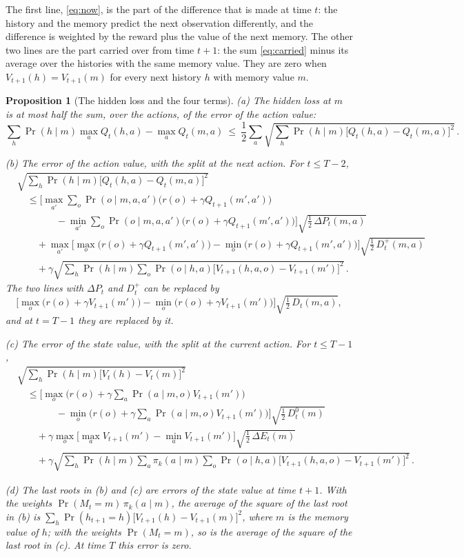 \documentclass[11pt]{article}
\newtheorem{proposition}{Proposition}
\theoremstyle{definition}
\newcommand{\dE}{\Delta E}
\newcommand{\dP}{\Delta P}
\begin{document}
The first line, \eqref{eq:now}, is the part of the difference that is made at time $t$: the history and the memory predict the next observation differently, and the difference is weighted by the reward plus the value of the next memory. The other two lines are the part carried over from time $t+1$: the sum \eqref{eq:carried} minus its average over the histories with the same memory value. They are zero when $V_{t+1}(h)=V_{t+1}(m)$ for every next history $h$ with memory value $m$.

\begin{proposition}[The hidden loss and the four terms]\label{prop:terms}
(a) The hidden loss at $m$ is at most half the sum, over the actions, of the error of the action value:
\[
\sum_h\Pr(h\mid m)\max_aQ_t(h,a)-\max_aQ_t(m,a)\ \le\ \frac12\sum_a\sqrt{\sum_h\Pr(h\mid m)\big[Q_t(h,a)-Q_t(m,a)\big]^2}\,.
\]

(b) The error of the action value, with the split at the next action. For $t\le T-2$,
\begin{align*}
&\sqrt{\sum_h\Pr(h\mid m)\big[Q_t(h,a)-Q_t(m,a)\big]^2}\\
&\quad\le\Big[\max_{a'}\sum_o\Pr(o\mid m,a,a')\big(r(o)+\gamma Q_{t+1}(m',a')\big)\\
&\qquad\qquad-\min_{a'}\sum_o\Pr(o\mid m,a,a')\big(r(o)+\gamma Q_{t+1}(m',a')\big)\Big]\sqrt{\tfrac12\,\dP_t(m,a)}\\
&\qquad+\max_{a'}\Big[\max_o\big(r(o)+\gamma Q_{t+1}(m',a')\big)-\min_o\big(r(o)+\gamma Q_{t+1}(m',a')\big)\Big]\sqrt{\tfrac12\,D^+_t(m,a)}\\
&\qquad+\gamma\sqrt{\sum_h\Pr(h\mid m)\sum_o\Pr(o\mid h,a)\big[V_{t+1}(h,a,o)-V_{t+1}(m')\big]^2}\,.
\end{align*}
The two lines with $\dP_t$ and $D^+_t$ can be replaced by
\[
\Big[\max_o\big(r(o)+\gamma V_{t+1}(m')\big)-\min_o\big(r(o)+\gamma V_{t+1}(m')\big)\Big]\sqrt{\tfrac12\,D_t(m,a)},
\]
and at $t=T-1$ they are replaced by it.

(c) The error of the state value, with the split at the current action. For $t\le T-1$,
\begin{align*}
&\sqrt{\sum_h\Pr(h\mid m)\big[V_t(h)-V_t(m)\big]^2}\\
&\quad\le\Big[\max_o\Big(r(o)+\gamma\sum_a\Pr(a\mid m,o)V_{t+1}(m')\Big)\\
&\qquad\qquad-\min_o\Big(r(o)+\gamma\sum_a\Pr(a\mid m,o)V_{t+1}(m')\Big)\Big]\sqrt{\tfrac12\,D^0_t(m)}\\
&\qquad+\gamma\max_o\Big[\max_aV_{t+1}(m')-\min_aV_{t+1}(m')\Big]\sqrt{\tfrac12\,\dE_t(m)}\\
&\qquad+\gamma\sqrt{\sum_h\Pr(h\mid m)\sum_a\pi_k(a\mid m)\sum_o\Pr(o\mid h,a)\big[V_{t+1}(h,a,o)-V_{t+1}(m')\big]^2}\,.
\end{align*}

(d) The last roots in (b) and (c) are errors of the state value at time $t+1$. With the weights $\Pr(M_t=m)\,\pi_k(a\mid m)$, the average of the square of the last root in (b) is $\sum_h\Pr(h_{t+1}=h)\big[V_{t+1}(h)-V_{t+1}(m)\big]^2$, where $m$ is the memory value of $h$; with the weights $\Pr(M_t=m)$, so is the average of the square of the last root in (c). At time $T$ this error is zero.
\end{proposition}
\end{document}
